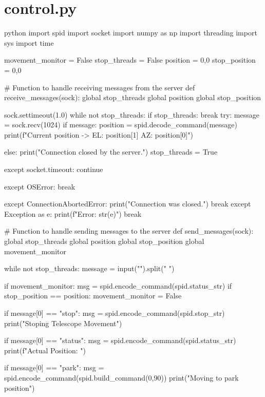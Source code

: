 \section*{control.py}

\begin{sourcecode}[]{python}{}
    import spid
import socket
import numpy as np
import threading
import sys
import time

movement_monitor = False
stop_threads = False
position = 0,0
stop_position = 0,0

# Function to handle receiving messages from the server
def receive_messages(sock):
    global stop_threads
    global position
    global stop_position

    sock.settimeout(1.0)
    while not stop_threads:
        if stop_threads:
            break
        try:
            message = sock.recv(1024)
            if message:
                position = spid.decode_command(message)
                print(f"Current position -> EL: {position[1]} AZ: {position[0]}")

            else:
                print("Connection closed by the server.")
                stop_threads = True
        
        except socket.timeout:
            continue

        except OSError:
            break

        except ConnectionAbortedError:
            print("Connection was closed.")
            break
        except Exception as e:
            print(f"Error: {str(e)}")
            break

# Function to handle sending messages to the server
def send_messages(sock):
    global stop_threads
    global position
    global stop_position
    global movement_monitor

    while not stop_threads:
        message = input("").split(" ")
        
        if movement_monitor:
            msg = spid.encode_command(spid.status_str)
            if stop_position == position:
                movement_monitor = False

        if message[0] == "stop":
            msg = spid.encode_command(spid.stop_str)
            print("Stoping Telescope Movement")

        if message[0] == "status":
            msg = spid.encode_command(spid.status_str)
            print(f"Actual Position: ")

        if message[0] == "park":
            msg = spid.encode_command(spid.build_command(0,90))
            print("Moving to park position")


\end{sourcecode}
